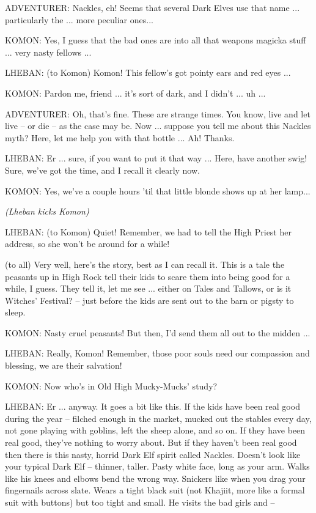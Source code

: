 ADVENTURER: Nackles, eh! Seems that several Dark Elves use that name ... particularly the ... more peculiar ones...

KOMON: Yes, I guess that the bad ones are into all that weapons magicka stuff ... very nasty fellows ...

LHEBAN: (to Komon) Komon! This fellow's got pointy ears and red eyes ...

KOMON: Pardon me, friend ... it's sort of dark, and I didn't ... uh ...

ADVENTURER: Oh, that's fine. These are strange times. You know, live and let live -- or die -- as the case may be. Now ... suppose you tell me about this Nackles myth? Here, let me help you with that bottle ... Ah! Thanks.

LHEBAN: Er ... sure, if you want to put it that way ... Here, have another swig! Sure, we've got the time, and I recall it clearly now.

KOMON: Yes, we've a couple hours 'til that little blonde shows up at her lamp...

\textit{(Lheban kicks Komon)}

LHEBAN: (to Komon) Quiet! Remember, we had to tell the High Priest her address, so she won't be around for a while!

(to all) Very well, here's the story, best as I can recall it. This is a tale the peasants up in High Rock tell their kids to scare them into being good for a while, I guess. They tell it, let me see ... either on Tales and Tallows, or is it Witches' Festival? -- just before the kids are sent out to the barn or pigsty to sleep.

KOMON: Nasty cruel peasants! But then, I'd send them all out to the midden ...

LHEBAN: Really, Komon! Remember, those poor souls need our compassion and blessing, we are their salvation!

KOMON: Now who's in Old High Mucky-Mucks' study?

LHEBAN: Er ... anyway. It goes a bit like this. If the kids have been real good during the year -- filched enough in the market, mucked out the stables every day, not gone playing with goblins, left the sheep alone, and so on. If they have been real good, they've nothing to worry about. But if they haven't been real good then there is this nasty, horrid Dark Elf spirit called Nackles. Doesn't look like your typical Dark Elf -- thinner, taller. Pasty white face, long as your arm. Walks like his knees and elbows bend the wrong way. Snickers like when you drag your fingernails across slate. Wears a tight black suit (not Khajiit, more like a formal suit with buttons) but too tight and small. He visits the bad girls and --

